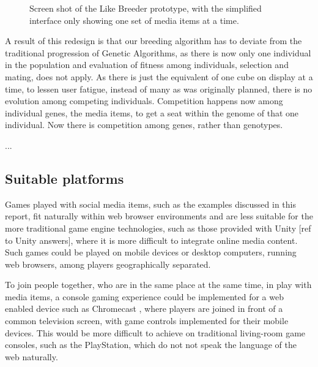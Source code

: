 \documentclass[]{article}
\begin{document}
\begin{figure}[htp]
	\caption{Screen shot of the Like Breeder prototype, with the simplified interface only showing one set of media items at a time.}
	\label{fig:likeBreeder}
\end{figure}

A result of this redesign is that our breeding algorithm has to deviate from the traditional progression of Genetic Algorithms, as there is now only one individual in the population and evaluation of fitness among individuals, selection and mating, does not apply.  As there is just the equivalent of one cube on display at a time, to lessen user fatigue, instead of many as was originally planned, there is no evolution among competing individuals.  Competition happens now among individual genes, the media items, to get a seat within the genome of that one individual.  Now there is competition among genes, rather than genotypes.




...


\subsection{Suitable platforms}

Games played with social media items, such as the examples discussed in this report, fit naturally within web browser environments and are less suitable for the more traditional game engine technologies, such as those provided with Unity [ref to Unity answers], where it is more difficult to integrate online media content.  Such games could be played on mobile devices or desktop computers, running web browsers, among players geographically separated.  

To join people together, who are in the same place at the same time, in play with media items, a console gaming experience could be implemented for a web enabled device such as Chromecast \cite{ChromecastGames}, where players are joined in front of a common television screen, with game controls implemented for their mobile devices.  This would be more difficult to achieve on traditional living-room game consoles, such as the PlayStation, which do not not speak the language of the web naturally.
\end{document}
